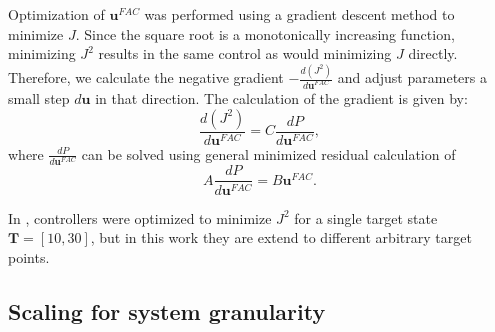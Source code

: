 \documentclass[12pt]{iopart}
\begin{document}
Optimization of $\mathbf{u}^{FAC}$ was performed using a gradient descent method to minimize $J$. Since the square root is a monotonically increasing function, minimizing $J^2$ results in the same control as would minimizing $J$ directly. Therefore, we calculate the negative gradient $-\frac{d(J^2)}{d\mathbf{u}^{FAC}}$ and adjust parameters a small step $d\mathbf{u}$ in that direction. The calculation of the gradient is given by:
\begin{equation}
\frac{d(J^2)}{d\mathbf{u}^{FAC}}=C \frac{dP}{d\mathbf{u}^{FAC}},
\end{equation}
where $\frac{dP}{d\mathbf{u}^{FAC}}$ can be solved using general minimized residual calculation of
\begin{equation}
A \frac{dP}{d\mathbf{u}^{FAC}}=B \mathbf{u}^{FAC}.
\end{equation}

In \cite{May2021}, controllers were optimized to minimize $J^2$ for a single target state $\mathbf{T} = [10,30]$, but in this work they are extend to different arbitrary target points.


\subsection{Scaling for system granularity}\label{sec:Scaling}
%
%
\end{document}
